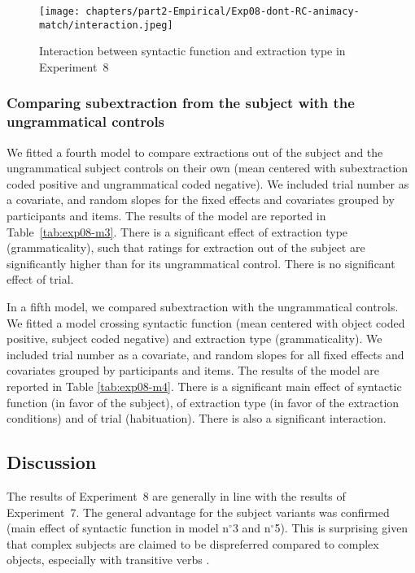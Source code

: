

\begin{figure}
    \centering
    \texttt{[image: chapters/part2-Empirical/Exp08-dont-RC-animacy-match/interaction.jpeg]}
    \caption{Interaction between syntactic function and extraction type in Experiment~8}
    \label{fig:exp08-interaction}
\end{figure}

\subsubsection{Comparing subextraction from the subject with the ungrammatical controls}\largerpage

We fitted a fourth model to compare extractions out of the subject and the ungrammatical subject controls on their own (mean centered with subextraction coded positive and ungrammatical coded negative). We included trial number as a covariate, and random slopes for the fixed effects and covariates grouped by participants and items. The results of the model are reported in Table~\ref{tab:exp08-m3}. There is a significant effect of extraction type (grammaticality), such that ratings for extraction out of the subject are significantly higher than for its ungrammatical control. There is no significant effect of trial.



In a fifth model, we compared subextraction with the ungrammatical controls. We fitted a model crossing syntactic function (mean centered with object coded positive, subject coded negative) and extraction type (grammaticality). We included trial number as a covariate, and random slopes for all fixed effects and covariates grouped by participants and items. The results of the model are reported in Table \ref{tab:exp08-m4}. 
There is a significant main effect of syntactic function (in favor of the subject), of extraction type (in favor of the extraction conditions) and of trial (habituation). There is also a significant interaction.



\subsection{Discussion}

The results of Experiment~8 are generally in line with the results of Experiment~7. The general advantage for the subject variants was confirmed (main effect of syntactic function in model n$^{\circ}$3 and n$^{\circ}$5). This is surprising given that complex subjects are claimed to be dispreferred compared to complex objects, especially with transitive verbs \citep{Kluender.2004}. 


